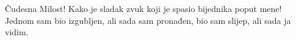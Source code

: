 Čudesna Milost!
Kako je sladak zvuk
koji je spasio bijednika poput mene!
Jednom sam bio izgubljen, ali sada sam pronađen,
bio sam slijep, ali sada ja vidim. 
